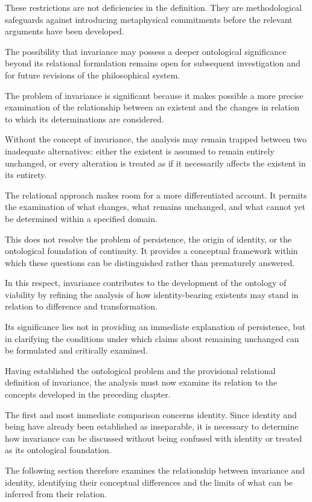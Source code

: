 These restrictions are not deficiencies in the definition.
They are methodological safeguards against introducing
metaphysical commitments before the relevant arguments
have been developed.

The possibility that invariance may possess a deeper
ontological significance beyond its relational
formulation remains open for subsequent investigation
and for future revisions of the philosophical system.


The problem of invariance is significant because it
makes possible a more precise examination of the
relationship between an existent and the changes
in relation to which its determinations are considered.

Without the concept of invariance, the analysis may
remain trapped between two inadequate alternatives:
either the existent is assumed to remain entirely
unchanged, or every alteration is treated as if it
necessarily affects the existent in its entirety.

The relational approach makes room for a more
differentiated account. It permits the examination
of what changes, what remains unchanged, and what
cannot yet be determined within a specified domain.

This does not resolve the problem of persistence,
the origin of identity, or the ontological foundation
of continuity. It provides a conceptual framework
within which these questions can be distinguished
rather than prematurely answered.

In this respect, invariance contributes to the
development of the ontology of viability by refining
the analysis of how identity-bearing existents may
stand in relation to difference and transformation.

Its significance lies not in providing an immediate
explanation of persistence, but in clarifying the
conditions under which claims about remaining
unchanged can be formulated and critically examined.


Having established the ontological problem and the
provisional relational definition of invariance,
the analysis must now examine its relation to the
concepts developed in the preceding chapter.

The first and most immediate comparison concerns
identity. Since identity and being have already been
established as inseparable, it is necessary to
determine how invariance can be discussed without
being confused with identity or treated as its
ontological foundation.

The following section therefore examines the
relationship between invariance and identity,
identifying their conceptual differences and the
limits of what can be inferred from their relation.


